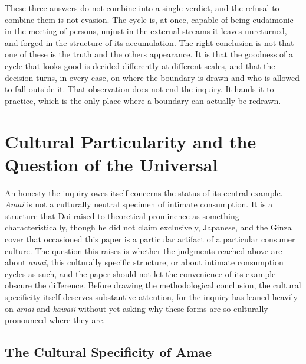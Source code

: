 \documentclass[11pt,a4paper]{article}
\begin{document}
These three answers do not combine into a single verdict, and the refusal to combine them is not evasion. The cycle is, at once, capable of being eudaimonic in the meeting of persons, unjust in the external streams it leaves unreturned, and forged in the structure of its accumulation. The right conclusion is not that one of these is the truth and the others appearance. It is that the goodness of a cycle that looks good is decided differently at different scales, and that the decision turns, in every case, on where the boundary is drawn and who is allowed to fall outside it. That observation does not end the inquiry. It hands it to practice, which is the only place where a boundary can actually be redrawn.

\section{Cultural Particularity and the Question of the Universal}

An honesty the inquiry owes itself concerns the status of its central example. \textit{Amai} is not a culturally neutral specimen of intimate consumption. It is a structure that Doi raised to theoretical prominence as something characteristically, though he did not claim exclusively, Japanese, and the Ginza cover that occasioned this paper is a particular artifact of a particular consumer culture. The question this raises is whether the judgments reached above are about \textit{amai}, this culturally specific structure, or about intimate consumption cycles as such, and the paper should not let the convenience of its example obscure the difference. Before drawing the methodological conclusion, the cultural specificity itself deserves substantive attention, for the inquiry has leaned heavily on \textit{amai} and \textit{kawaii} without yet asking why these forms are so culturally pronounced where they are.

\subsection{The Cultural Specificity of Amae}
\end{document}
